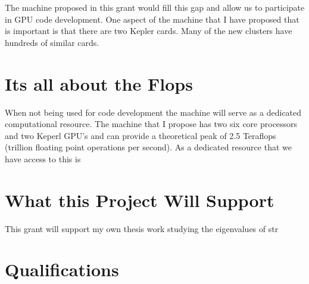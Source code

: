 \documentclass[11pt]{article}
\begin{document}
 The machine proposed in this grant would fill this gap and allow us to participate in GPU code development.  One aspect of the machine that I have proposed that is important is that there are two Kepler cards.  Many of the new clusters have hundreds of similar cards.  
  
  \section*{Its all about the Flops} %
  When not being used for code development the machine will serve as a dedicated computational resource.  
  The machine that I propose has two six core processors and two Keperl GPU's and can provide a theoretical peak of 2.5 Teraflops (trillion floating point operations per second).  
  As a dedicated resource that we have access to this is

  \section*{What this Project Will Support} %
  This grant will support my own thesis work studying the eigenvalues of str

  \section*{Qualifications} %
\end{document}

